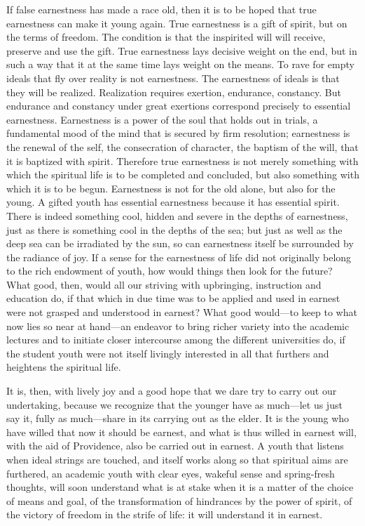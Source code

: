 \documentclass[12pt]{book}
\newcommand{\opage}[1]{\marginnote{\footnotesize\textit{[#1]}}}
\begin{document}
If false earnestness has made a race old, then it is to be hoped that
true earnestness can make it young again. True earnestness is a gift of
spirit, but on the terms of freedom. The condition is that the
inspirited will will receive, preserve
\opage{15}\setcounter{footnote}{0}%
and use the gift. True earnestness lays decisive weight on the end, but
in such a way that it at the same time lays weight on the means. To
rave for empty ideals that fly over reality is not earnestness. The
earnestness of ideals is that they will be realized. Realization
requires exertion, endurance, constancy. But endurance and constancy
under great exertions correspond precisely to essential earnestness.
Earnestness is a power of the soul that holds out in trials, a
fundamental mood of the mind that is secured by firm resolution;
earnestness is the renewal of the self, the consecration of character,
the baptism of the will, that it is baptized with spirit. Therefore true
earnestness is not merely something with which the spiritual life is to
be completed and concluded, but also something with which it is to be
begun. Earnestness is not for the old alone, but also for the young. A
gifted youth has essential earnestness because it has essential spirit.
There is indeed something cool, hidden and severe in the depths of
earnestness, just as there is something cool in the depths of the sea;
but just as well as the deep sea can be irradiated by the sun, so can
earnestness itself be surrounded by the radiance of joy. If a sense for
the earnestness of life did not originally belong to the rich endowment
of youth, how would things then look for the future? What good, then,
would all our striving with upbringing, instruction and education do, if
that which in due time was to be applied and used in earnest were not
grasped and understood in earnest? What good would---to keep to what now
lies so near at hand---an endeavor to bring richer variety into the
academic lectures and to initiate closer intercourse among the different
universities do, if the student youth were not itself livingly
interested in all that furthers and heightens the spiritual life.

It is, then, with lively joy and a good hope that we dare
\opage{16}\setcounter{footnote}{0}%
try to carry out our undertaking, because we recognize that the younger
have as much---let us just say it, fully as much---share in its carrying
out as the elder. It is the young who have willed that now it should be
earnest, and what is thus willed in earnest will, with the aid of
Providence, also be carried out in earnest. A youth that listens when
ideal strings are touched, and itself works along so that spiritual aims
are furthered, an academic youth with clear eyes, wakeful sense and
spring-fresh thoughts, will soon understand what is at stake when it is
a matter of the choice of means and goal, of the transformation of
hindrances by the power of spirit, of the victory of freedom in the
strife of life: it will understand it in earnest.
\end{document}
